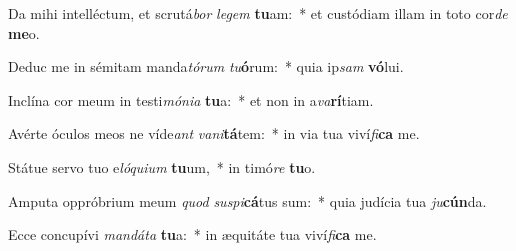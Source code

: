 \item Da mihi intelléctum, et scrutá\textit{bor} \textit{le}\textit{gem} \textbf{tu}am:~* et custódiam illam in toto cor\textit{de} \textbf{me}o.
\item Deduc me in sémitam manda\textit{tó}\textit{rum} \textit{tu}\textbf{ó}rum:~* quia ip\textit{sam} \textbf{vó}lui.
\item Inclína cor meum in testi\textit{mó}\textit{ni}\textit{a} \textbf{tu}a:~* et non in a\textit{va}\textbf{rí}tiam.
\item Avérte óculos meos ne víde\textit{ant} \textit{va}\textit{ni}\textbf{tá}tem:~* in via tua viví\textit{fi}\textbf{ca} me.
\item Státue servo tuo e\textit{ló}\textit{qui}\textit{um} \textbf{tu}um,~* in timó\textit{re} \textbf{tu}o.
\item Amputa oppróbrium meum \textit{quod} \textit{su}\textit{spi}\textbf{cá}tus sum:~* quia judícia tua \textit{ju}\textbf{cún}da.
\item Ecce concupívi \textit{man}\textit{dá}\textit{ta} \textbf{tu}a:~* in æquitáte tua viví\textit{fi}\textbf{ca} me.
